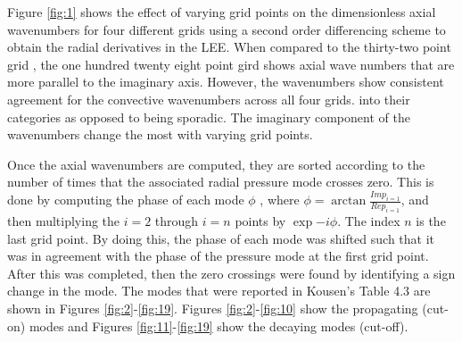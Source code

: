 \documentclass[a4paper]{article}
\begin{document}
Figure \ref{fig:1} shows the effect of varying grid points on the dimensionless 
axial wavenumbers for four different grids using a second order differencing 
scheme to obtain the radial derivatives in the LEE. When compared to the thirty-two 
point grid , the one hundred twenty eight point gird shows axial wave numbers 
that are more parallel to the imaginary axis. However, the wavenumbers show
consistent agreement for the convective wavenumbers across all four grids.  
into their categories as opposed to being sporadic. The imaginary component of 
the wavenumbers change the most with varying grid points. 

Once the axial wavenumbers are computed, they are sorted according to the number 
of times that the associated radial pressure mode crosses zero. This is done by 
computing the phase of each mode $\phi$ , where 
$\phi = \arctan \frac{Im{p_{i=1}}}{Re{p_{i=1}}}$, and then multiplying the 
$i=2$ through $i=n$ points by  $\exp{-i\phi}$. The index $n$ is the last grid point. 
By doing this, the phase of each mode was shifted such that it was in agreement
with the phase of the pressure mode at the first grid point. After this was
completed, then the zero crossings were found by identifying a sign change in 
the mode. The modes that were reported in Kousen's Table 4.3 are shown in Figures \ref{fig:2}-\ref{fig:19}.
Figures \ref{fig:2}-\ref{fig:10} show the propagating (cut-on) modes and Figures
\ref{fig:11}-\ref{fig:19} show the decaying modes (cut-off).  
\end{document}
